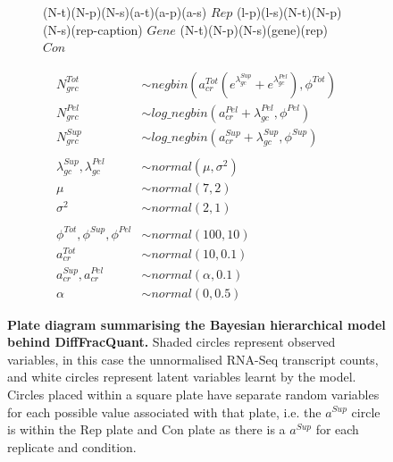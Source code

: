 \documentclass[../main.tex]{subfiles}
\begin{document}
\begin{figure}
\begin{subfigure}[b]{0.4\textwidth}
{        %
         {(N-t)(N-p)(N-s)(a-t)(a-p)(a-s)} {$Rep$}
         {(l-p)(l-s)(N-t)(N-p)(N-s)(rep-caption)} {$Gene$}
         {(N-t)(N-p)(N-s)(gene)(rep)} {$Con$}
    }
    \end{subfigure}
     \hfill
     \begin{subfigure}[b]{0.57\textwidth}
     \centering
     \begin{align*}
        N^{Tot}_{grc} & \sim  negbin(a^{Tot}_{cr}(e^{\lambda^{Sup}_{gc}} + e^{\lambda^{Pel}_{gc}}), \phi^{Tot})\\
        N^{Pel}_{grc} & \sim  log\_negbin(a^{Pel}_{cr}+\lambda^{Pel}_{gc}, \phi^{Pel})\\
        N^{Sup}_{grc} & \sim  log\_negbin(a^{Sup}_{cr}+\lambda^{Sup}_{gc}, \phi^{Sup})\\
        &\\
        \lambda^{Sup}_{gc}, \lambda^{Pel}_{gc} &\sim normal(\mu, \sigma^2)\\
        \mu &\sim normal(7,2)\\
        \sigma^2&\sim normal(2,1)\\
        &\\
        \phi^{Tot}, \phi^{Sup}, \phi^{Pel}&\sim normal(100,10)\\
        a^{Tot}_{cr}&\sim normal(10, 0.1)\\
        a^{Sup}_{cr}, a^{Pel}_{cr}&\sim normal(\alpha, 0.1)\\
        \alpha&\sim normal(0, 0.5)
    \end{align*}
     \end{subfigure}
     \caption[Overview of DiffFracQuant Model.]{\textbf{Plate diagram summarising the Bayesian hierarchical model behind DiffFracQuant.} Shaded circles represent observed variables, in this case the unnormalised RNA-Seq transcript counts, and white circles represent latent variables learnt by the model. Circles placed within a square plate have separate random variables for each possible value associated with that plate, i.e. the $a^{Sup}$ circle is within the Rep plate and Con plate as there is a $a^{Sup}$ for each replicate and condition.}
\end{figure}
\end{document}

